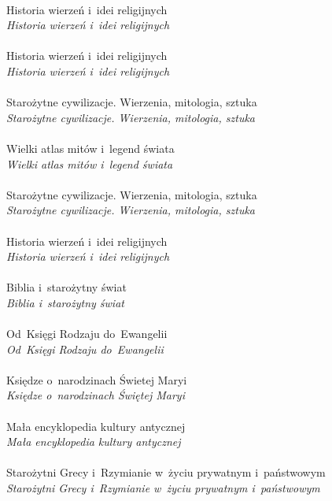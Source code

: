 \documentclass[a4paper,11pt]{article}
\begin{document}
 \\
\Jest  Historia wierzeń i~idei religijnych \\
\Powin \emph{Historia wierzeń i~idei religijnych} \\
 \\
\Jest  Historia wierzeń i~idei religijnych \\
\Powin \emph{Historia wierzeń i~idei religijnych} \\
 \\
\Jest  Starożytne cywilizacje. Wierzenia, mitologia, sztuka \\
\Powin \emph{Starożytne cywilizacje. Wierzenia, mitologia, sztuka} \\
 \\
\Jest  Wielki atlas mitów i~legend świata \\
\Powin \emph{Wielki atlas mitów i~legend świata} \\
 \\
\Jest  Starożytne cywilizacje. Wierzenia, mitologia, sztuka \\
\Powin \emph{Starożytne cywilizacje. Wierzenia, mitologia, sztuka} \\
 \\
\Jest  Historia wierzeń i~idei religijnych \\
\Powin \emph{Historia wierzeń i~idei religijnych} \\
 \\
\Jest  Biblia i~starożytny świat \\
\Powin \emph{Biblia i~starożytny świat} \\
 \\
\Jest  Od~Księgi Rodzaju do~Ewangelii \\
\Powin \emph{Od~Księgi Rodzaju do~Ewangelii} \\
 \\
\Jest  Księdze o~narodzinach Świetej Maryi \\
\Powin \emph{Księdze o~narodzinach Świętej Maryi} \\
 \\
\Jest  Mała encyklopedia kultury antycznej \\
\Powin \emph{Mała encyklopedia kultury antycznej} \\
 \\
\Jest  Starożytni Grecy i~Rzymianie w~życiu prywatnym i~państwowym \\
\Powin \emph{Starożytni Grecy i~Rzymianie w~życiu prywatnym i~państwowym} \\
\end{document}
